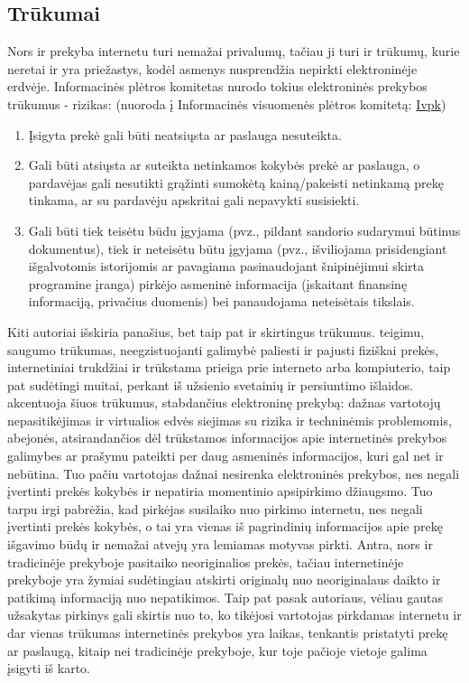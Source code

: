 \documentclass[12pt, titlepage]{article}
\begin{document}
\subsection{Trūkumai}
\smallskip
\par
\hspace{\parindent}
Nors ir prekyba internetu turi nemažai privalumų, tačiau ji turi ir trūkumų, kurie neretai ir yra priežastys, kodėl asmenys nusprendžia nepirkti elektroninėje erdvėje. Informacinės plėtros komitetas nurodo tokius elektroninės prekybos trūkumus - rizikas: (nuoroda į Informacinės visuomenės plėtros komitetą: \href{https://ivpk.lrv.lt} {Ivpk})
\smallskip
\begin{enumerate}
\item Įsigyta prekė gali būti neatsiųsta ar paslauga nesuteikta.
\item Gali būti atsiųsta ar suteikta netinkamos kokybės prekė ar paslauga, o pardavėjas gali nesutikti grąžinti sumokėtą kainą/pakeisti netinkamą prekę tinkama, ar su pardavėju apskritai gali nepavykti susisiekti.
\item Gali būti tiek teisėtu būdu įgyjama (pvz., pildant sandorio sudarymui būtinus dokumentus), tiek ir neteisėtu būtu įgyjama (pvz., išviliojama prisidengiant išgalvotomis istorijomis ar pavagiama pasinaudojant šnipinėjimui skirta programine įranga) pirkėjo asmeninė informacija (įskaitant finansinę informaciją, privačius duomenis) bei panaudojama neteisėtais tikslais.
\end{enumerate}
\smallskip
\par
Kiti autoriai išskiria panašius, bet taip pat ir skirtingus trūkumus. \textcite{dambrauskaite2014elektronines} teigimu, saugumo trūkumas, neegzistuojanti galimybė paliesti ir pajusti fiziškai prekės, internetiniai trukdžiai ir trūkstama prieiga prie interneto arba kompiuterio, taip pat sudėtingi muitai, perkant iš užsienio svetainių ir persiuntimo išlaidos. \textcite{jurgelionyte2010elektronines} akcentuoja šiuos trūkumus, stabdančius elektroninę prekybą: dažnas vartotojų nepasitikėjimas ir virtualios edvės siejimas su rizika ir techninėmis problemomis, abejonės, atsirandančios dėl trūkstamos informacijos apie internetinės prekybos galimybes ar prašymu pateikti per daug asmeninės informacijos, kuri gal net ir nebūtina. Tuo pačiu vartotojas dažnai nesirenka elektroninės prekybos, nes negali įvertinti prekės kokybės ir nepatiria momentinio apsipirkimo džiaugsmo. Tuo tarpu \textcite{vsivickas2011elektronine} irgi pabrėžia, kad pirkėjas susilaiko nuo pirkimo internetu, nes negali įvertinti prekės kokybės, o tai yra vienas iš pagrindinių informacijos apie prekę išgavimo būdų ir nemažai atvejų yra lemiamas motyvas pirkti. Antra, nors ir tradicinėje prekyboje pasitaiko neoriginalios prekės, tačiau internetinėje prekyboje yra žymiai sudėtingiau atskirti originalų nuo neoriginalaus daikto ir patikimą informaciją nuo nepatikimos. Taip pat pasak autoriaus, vėliau gautas užsakytas pirkinys gali skirtis nuo to, ko tikėjosi vartotojas pirkdamas internetu ir dar vienas trūkumas internetinės prekybos yra laikas, tenkantis pristatyti prekę ar paslaugą, kitaip nei tradicinėje prekyboje, kur toje pačioje vietoje galima įsigyti iš karto.
\end{document}

